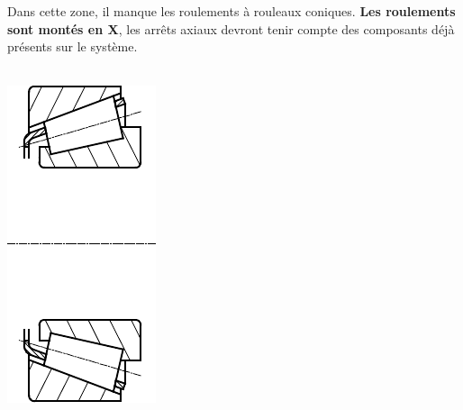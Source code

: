 \begin{minipage}{0.6\linewidth}
Dans cette zone, il manque les roulements à rouleaux coniques. \textbf{Les roulements sont montés en X}, les arrêts axiaux devront tenir compte des composants déjà présents sur le système.
\\ ~\ \\
\begin{minipage}{0.25\linewidth}
\begin{center}
 \includegraphics[width=\linewidth]{img/Roulements}

\end{center}
\end{minipage}
\end{minipage}
